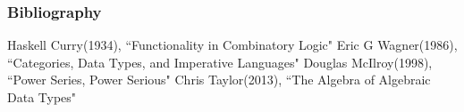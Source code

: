 \documentclass{beamer}
\begin{document}
%




\frame
{
  \frametitle{Bibliography}
  Haskell Curry(1934), ``Functionality in Combinatory Logic"\newline\newline
  Eric G Wagner(1986), ``Categories, Data Types, and Imperative Languages"\newline\newline
  Douglas McIlroy(1998), ``Power Series, Power Serious"\newline\newline
  Chris Taylor(2013), ``The Algebra of Algebraic Data Types"
}
\end{document}
